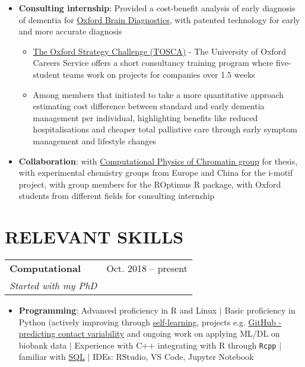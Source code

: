 \documentclass{article}
\makeatletter
\newcommand{\resumeItem}[2]{
  \item\small{
    \textbf{#1}{: #2 \vspace{-2pt}}
  }
}
\newcommand{\resumeSubheading}[4]{
  \vspace{-1pt}\item
    \begin{tabular*}{0.97\textwidth}[t]{l@{\extracolsep{\fill}}r}
      \textbf{#1} & #2 \\
      \textit{\small#3} & \textit{\small #4} \\
    \end{tabular*}\vspace{-5pt}
}
\newcommand{\resumeItemListStart}{\begin{itemize}}
\newcommand{\resumeItemListEnd}{\end{itemize}\vspace{-5pt}}
\makeatother
\begin{document}
            \resumeItemListStart
                \resumeItem{Consulting internship}{Provided a cost-benefit analysis of early diagnosis of dementia for \href{https://www.oxfordbraindiagnostics.com/}{Oxford Brain Diagnostics}, with patented technology for early and more accurate diagnosis}
                    \begin{itemize}
                        \item {\href{https://www.careers.ox.ac.uk/oxford-strategy-challenge}{The Oxford Strategy Challenge (TOSCA)} - The University of Oxford Careers Service offers a short consultancy training program where five-student teams work on projects for companies over 1.5 weeks}
                        \item {Among members that initiated to take a more quantitative approach estimating cost difference between standard and early dementia management per individual, highlighting benefits like reduced hospitalisations and cheaper total palliative care through early symptom management and lifestyle changes}
                    \end{itemize}
            \resumeItemListEnd
    
            \resumeItemListStart
                \resumeItem{Collaboration}{with \href{http://www.collepardolab.org/}{Computational Physics of Chromatin group} for thesis, with experimental chemistry groups from Europe and China for the i-motif project, with group members for the ROptimus R package, with Oxford students from different fields for consulting internship}
            \resumeItemListEnd

\section{RELEVANT SKILLS}

        \resumeSubheading
        {Computational}{Oct. 2018 -- present}{Started with my PhD}{}
            \resumeItemListStart
                \resumeItem{Programming}{Advanced proficiency in R and Linux $|$ Basic proficiency in Python (actively improving through \href{https://github.com/liezeltamon/advent-of-code}{self-learning}, projects e.g. \href{https://github.com/liezeltamon/predicting-contact-variability/tree/main}{GitHub - predicting contact variability} and ongoing work on applying ML/DL on biobank data $|$ Experience with C++ integrating with R through \texttt{Rcpp} $|$ familiar with \href{https://learn.365datascience.com/certificates/CC-1C72E62035/}{SQL} $|$ IDEs: RStudio, VS Code, Jupyter Notebook}
            \resumeItemListEnd
\end{document}
